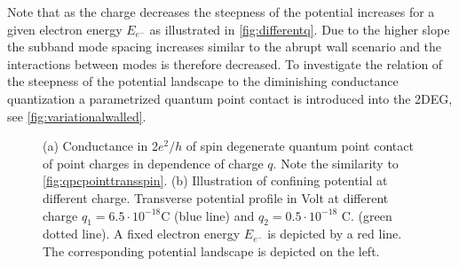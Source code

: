 Note that as the charge decreases the steepness of the potential increases for a given electron energy $E_{e^-}$ as illustrated in \cref{fig:differentq}. Due to the higher slope the subband mode spacing increases similar to the abrupt wall scenario and the interactions between modes is therefore decreased.
 To investigate the relation of the steepness of the potential landscape to the diminishing conductance quantization a parametrized  quantum point contact is introduced into the 2DEG, see \cref{fig:variationalwalled}.
\begin{figure}[h]
\centering
{}
\caption{(a) Conductance in 2$e^2/h$ of spin degenerate quantum point contact of point charges in dependence of charge $q$. Note the similarity to \cref{fig:qpcpointtransspin}. (b) Illustration of confining potential at different charge. Transverse potential profile in Volt at different charge $q_1 = 6.5 \cdot 10^{-18}$C (blue line) and $q_2= 0.5 \cdot 10^{-18}$ C. (green dotted line). A fixed electron energy $E_{e^-}$ is depicted by a red line. The corresponding potential landscape is depicted on the left.}\label{fig:pointtrans}
\end{figure}
\FloatBarrier
